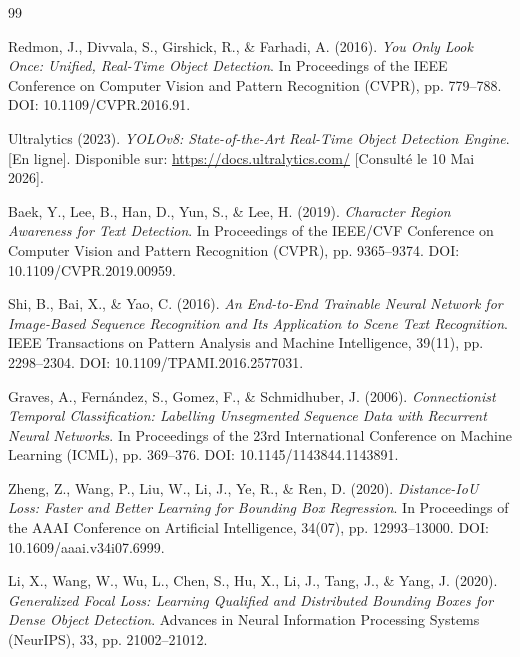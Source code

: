 \documentclass[12pt,a4paper]{article}
\begin{document}
\newpage

\begin{thebibliography}{99}

Redmon, J., Divvala, S., Girshick, R., \& Farhadi, A. (2016).
\textit{You Only Look Once: Unified, Real-Time Object Detection}.
In Proceedings of the IEEE Conference on Computer Vision and Pattern Recognition (CVPR), pp. 779--788. DOI: 10.1109/CVPR.2016.91.

Ultralytics (2023).
\textit{YOLOv8: State-of-the-Art Real-Time Object Detection Engine}.
[En ligne]. Disponible sur: \url{https://docs.ultralytics.com/} [Consulté le 10 Mai 2026].

Baek, Y., Lee, B., Han, D., Yun, S., \& Lee, H. (2019).
\textit{Character Region Awareness for Text Detection}.
In Proceedings of the IEEE/CVF Conference on Computer Vision and Pattern Recognition (CVPR), pp. 9365--9374. DOI: 10.1109/CVPR.2019.00959.

Shi, B., Bai, X., \& Yao, C. (2016).
\textit{An End-to-End Trainable Neural Network for Image-Based Sequence Recognition and Its Application to Scene Text Recognition}.
IEEE Transactions on Pattern Analysis and Machine Intelligence, 39(11), pp. 2298--2304. DOI: 10.1109/TPAMI.2016.2577031.

Graves, A., Fernández, S., Gomez, F., \& Schmidhuber, J. (2006).
\textit{Connectionist Temporal Classification: Labelling Unsegmented Sequence Data with Recurrent Neural Networks}.
In Proceedings of the 23rd International Conference on Machine Learning (ICML), pp. 369--376. DOI: 10.1145/1143844.1143891.

Zheng, Z., Wang, P., Liu, W., Li, J., Ye, R., \& Ren, D. (2020).
\textit{Distance-IoU Loss: Faster and Better Learning for Bounding Box Regression}.
In Proceedings of the AAAI Conference on Artificial Intelligence, 34(07), pp. 12993--13000. DOI: 10.1609/aaai.v34i07.6999.

Li, X., Wang, W., Wu, L., Chen, S., Hu, X., Li, J., Tang, J., \& Yang, J. (2020).
\textit{Generalized Focal Loss: Learning Qualified and Distributed Bounding Boxes for Dense Object Detection}.
Advances in Neural Information Processing Systems (NeurIPS), 33, pp. 21002--21012.


\end{thebibliography}
\end{document}
